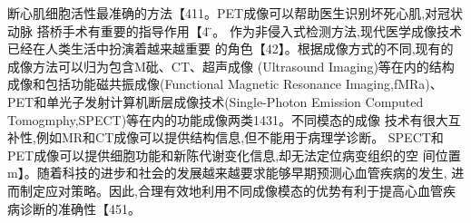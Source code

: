         断心肌细胞活性最准确的方法【411。PET成像可以帮助医生识别坏死心肌,对冠状动脉
        搭桥手术有重要的指导作用【4 ̈。
        作为非侵入式检测方法,现代医学成像技术已经在人类生活中扮演着越来越重要
        的角色【42】。根据成像方式的不同,现有的成像方法可以归为包含M砒、CT、超声成像
        (Ultrasound
         Imaging)等在内的结构成像和包括功能磁共振成像(Functional Magnetic
 Resonance
          Imaging,fMRa)、PET和单光子发射计算机断层成像技术(Single-Photon
          Emission Computed
           Tomogmphy,SPECT)等在内的功能成像两类1431。不同模态的成像
           技术有很大互补性,例如MR和CT成像可以提供结构信息,但不能用于病理学诊断。
           SPECT和PET成像可以提供细胞功能和新陈代谢变化信息,却无法定位病变组织的空
           间位置m】。随着科技的进步和社会的发展越来越要求能够早期预测心血管疾病的发生,
           进而制定应对策略。因此,合理有效地利用不同成像模态的优势有利于提高心血管疾
           病诊断的准确性【451。
